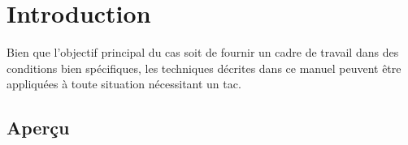 \chapter{Introduction}

\begin{center}
\end{center}

\begin{e1}
	\item 
	Bien que l'objectif principal du \gls{cas} soit de fournir un cadre de travail dans des conditions bien spécifiques, les techniques décrites dans ce manuel peuvent être appliquées à toute situation nécessitant un \gls{tac}.%
\end{e1}

\section{Aperçu}

